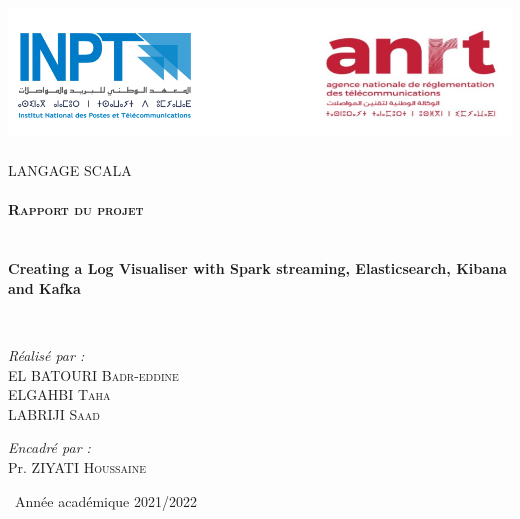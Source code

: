\begin{titlepage}
\begin{center}

\includegraphics[width=1\textwidth]{./INPT+ANRT}~\\[1.5cm]

\textsc{\Large LANGAGE SCALA }\\[2.5cm]

\textsc{\Large }\\[0.4cm]

\textsc{\LARGE \textbf{Rapport du projet}}\\[0.3cm]



\HRule \\[0.5cm]


\vspace{.5cm}
{\huge \bfseries \\ Creating a Log Visualiser with Spark streaming, Elasticsearch, Kibana and Kafka \\[0.7cm] }

\HRule \\[1.5cm]
\vspace{1.2cm}

\begin{minipage}{0.4\textwidth}
\begin{flushleft} \large
\emph{Réalisé par :}\\[0.5 cm]
EL BATOURI  \textsc{Badr-eddine}\\
ELGAHBI  \textsc{Taha}\\
LABRIJI  \textsc{Saad}\\

\end{flushleft}
\end{minipage}
\begin{minipage}{0.4\textwidth}
\begin{flushright} \large
\emph{Encadré par :} \\[0.5 cm]
Pr. ZIYATI \textsc{Houssaine}\\
 
\end{flushright}
\end{minipage}



\vfill


{\large \ Année académique 2021/2022}

\end{center}
\end{titlepage}